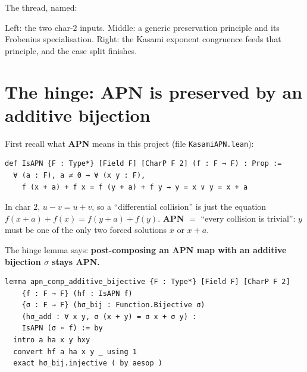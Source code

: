 \documentclass[11pt]{article}
\newcommand{\note}[1]{%
  \par\smallskip
  \noindent\colorbox{leanbg}{\parbox{\dimexpr\linewidth-2\fboxsep}{\small #1}}%
  \par\smallskip}
\begin{document}
\bigskip
\noindent
The thread, named:
\begin{center}
\end{center}

\medskip
\noindent
Left: the two char-$2$ inputs. Middle: a generic preservation principle and
its Frobenius specialisation. Right: the Kasami exponent congruence feeds
that principle, and the case split finishes.

\bigskip

\section{The hinge: APN is preserved by an additive bijection}

First recall what \textbf{APN} means in this project
(file \texttt{KasamiAPN.lean}):

\begin{lstlisting}
def IsAPN {F : Type*} [Field F] [CharP F 2] (f : F → F) : Prop :=
  ∀ (a : F), a ≠ 0 → ∀ (x y : F),
    f (x + a) + f x = f (y + a) + f y → y = x ∨ y = x + a
\end{lstlisting}

\note{In char $2$, $u - v = u + v$, so a ``differential collision'' is just the
equation $f(x+a)+f(x) = f(y+a)+f(y)$. \textbf{APN} $=$ ``every collision is
trivial'': $y$ must be one of the only two forced solutions $x$ or $x+a$.}

\bigskip
\noindent
The hinge lemma says: \textbf{post-composing an APN map with an additive
bijection $σ$ stays APN.}

\begin{lstlisting}
lemma apn_comp_additive_bijective {F : Type*} [Field F] [CharP F 2]
    {f : F → F} (hf : IsAPN f)
    {σ : F → F} (hσ_bij : Function.Bijective σ)
    (hσ_add : ∀ x y, σ (x + y) = σ x + σ y) :
    IsAPN (σ ∘ f) := by
  intro a ha x y hxy
  convert hf a ha x y _ using 1
  exact hσ_bij.injective ( by aesop )
\end{lstlisting}
\end{document}
